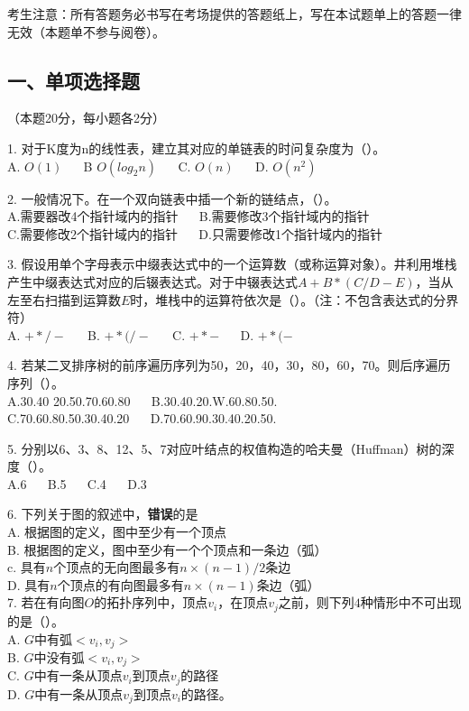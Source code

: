 

考生注意：所有答题务必书写在考场提供的答题纸上，写在本试题单上的答题一律无效（本题单不参与阅卷）。

\subsection{一、单项选择题}
（本题20分，每小题各2分）

1. 对于K度为n的线性表，建立其对应的单链表的时问复杂度为（）。 \\
A. $O(1)$ $\quad$ B $O(log_2n)$ $\quad$ C. $O(n)$ $\quad$ D. $O(n^2)$

2. 一般情况下。在一个双向链表中插一个新的链结点，（）。 \\
A.需要器改4个指针域内的指针 $\quad$ B.需要修改3个指针域内的指针 \\
C.需要修改2个指针域内的指针 $\quad$ D.只需要修改1个指针域内的指针

3. 假设用单个字母表示中缀表达式中的一个运算数（或称运算对象）。井利用堆栈产生中缀表达式对应的后辍表达式。对于中辍表达式$A+B*(C/D-E)$，当从左至右扫描到运算数$E$时，堆栈中的运算符依次是（）。（注：不包含表达式的分界符） \\
A. $+*/-$  $\quad$  B. $+*(/-$ $\quad$  C. $+*-$ $\quad$ D. $+*(-$

4. 若某二叉排序树的前序遍历序列为50，20，40，30，80，60，70。则后序遍历序列（）。 \\
A.30.40 20.50.70.60.80 $\quad$ B.30.40.20.W.60.80.50. \\
C.70.60.80.50.30.40.20 $\quad$ D.70.60.90.30.40.20.50.

5. 分别以6、3、8、12、5、7对应叶结点的权值构造的哈夫曼（Huffman）树的深度（）。 \\
A.6  $\quad$ B.5 $\quad$ C.4 $\quad$ D.3

6. 下列关于图的叙述中，\textbf{错误}的是 \\
A. 根据图的定义，图中至少有一个顶点 \\
B. 根据图的定义，图中至少有一个个顶点和一条边（弧） \\
c. 具有$n$个顶点的无向图最多有$n\times(n-1)/2$条边 \\
D. 具有$n$个顶点的有向图最多有$n\times(n-1)$条边（弧） \\

7. 若在有向图$O$的拓扑序列中，顶点$v_i$，在顶点$v_j$之前，则下列$4$种情形中不可出现的是（）。 \\
A. $G$中有弧$<v_i,v_j>$ \\
B. $G$中没有弧$<v_i,v_j>$ \\
C. $G$中有一条从顶点$v_i$到顶点$v_j$的路径 \\
D. $G$中有一条从顶点$v_j$到顶点$v_i$的路径。

